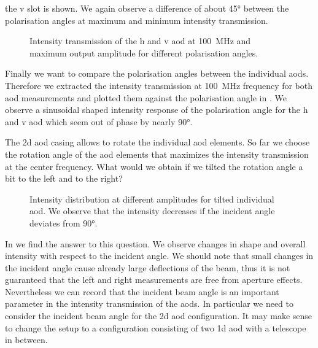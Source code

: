 the \gls{v} slot is shown. We again observe a difference of about \ang{45}
between the polarisation angles at maximum and minimum intensity transmission.
\begin{figure}[htb]
  \centering
  \begin{adjustbox}{width=\textwidth}
  \end{adjustbox}
  \caption{Intensity transmission of the \gls{h} and \gls{v} \gls{aod} at
    \SI{100}{\mega\hertz} and maximum output amplitude for different
    polarisation angles.
  }\label{fig:intensity_polarisation}
\end{figure}
Finally we want to compare the polarisation angles between the individual
\gls{aod}s. Therefore we extracted the intensity transmission at
\SI{100}{\mega\hertz} frequency for both \gls{aod} measurements and plotted
them against the polarisation angle in . We
observe a sinusoidal shaped intensity response of the polarisation angle
for the \gls{h} and \gls{v} \gls{aod} which seem out of phase by nearly
\ang{90}.

The \gls{2d} \gls{aod} casing allows to rotate the individual \gls{aod}
elements. So far we choose the rotation angle of the \gls{aod} elements that
maximizes the intensity transmission at the center frequency. What would we
obtain if we tilted the rotation angle a bit to the left and to the right?
\begin{figure}[htb]
  \centering
  \begin{adjustbox}{width=\textwidth}
  \end{adjustbox}
  \caption{Intensity distribution at different amplitudes for tilted
    individual \gls{aod}. We observe that the intensity decreases if the
    incident angle deviates from \ang{90}.
  }\label{fig:intensity_distribution_tilted}
\end{figure}
In  we find the answer to this
question. We observe changes in shape and overall intensity with respect
to the incident angle. We should note that small changes in the incident
angle cause already large deflections of the beam, thus it is not guaranteed
that the left and right measurements are free from aperture effects.
Nevertheless we can record that the incident beam angle is an important
parameter in the intensity transmission of the \gls{aod}s. In particular we
need to consider the incident beam angle for the \gls{2d} \gls{aod}
configuration. It may make sense to change the setup to a configuration
consisting of two \gls{1d} \gls{aod} with a telescope in between.

